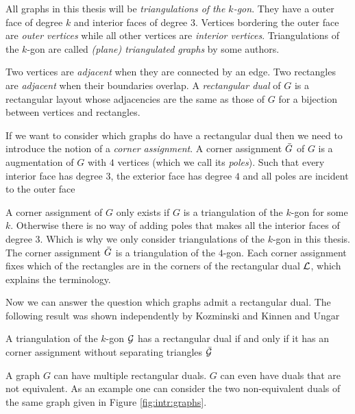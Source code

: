   All graphs in this thesis will be \emph{triangulations of the $k$-gon}. They have a outer face of degree $k$ and interior faces of degree $3$.
  Vertices bordering the outer face are \emph{outer vertices} while all other vertices are \emph{interior vertices}.
  Triangulations of the $k$-gon are called \emph{(plane) triangulated graphs} by some authors.

  Two vertices are \emph{adjacent} when they are connected by an edge. Two rectangles are \emph{adjacent} when their boundaries overlap. A \emph{rectangular dual} of $G$ is a rectangular layout whose adjacencies are the same as those of $G$ for a bijection between vertices and rectangles.

  If we want to consider which graphs do have a rectangular dual then we need to introduce the notion of a \emph{corner assignment}.
  A corner assignment $\bar{G}$ of $G$ is a augmentation of $G$ with $4$ vertices (which we call its \emph{poles}). Such that every interior face has degree $3$, the exterior face has degree $4$ and all poles are incident to the outer face

  A corner assignment of $G$ only exists if $G$ is a triangulation of the $k$-gon for some $k$. Otherwise there is no way of adding poles that makes all the interior faces of degree $3$. Which is why we only consider triangulations of the $k$-gon in this thesis. The corner assignment $\bar{G}$ is a triangulation of the $4$-gon. Each corner assignment fixes which of the rectangles are in the corners of the rectangular dual $\mathcal{L}$, which explains the terminology.


  Now we can answer the question which graphs admit a rectangular dual. The following result was shown independently by Kozminski and Kinnen \cite{Kozminski1984} and Ungar \cite{Ungar1953}

  \begin{thrm}
    \label{th:rect:exsitenceREctangularDual}
    A triangulation of the $k$-gon $\mathcal{G}$ has a rectangular dual if and only if it has an corner assignment without separating triangles $\bar{\mathcal{G}}$
  \end{thrm}

  A graph $G$ can have multiple rectangular duals. $G$ can even have duals that are not equivalent. As an example one can consider the two non-equivalent duals of the same graph given in Figure \ref{fig:intr:graphs}.

